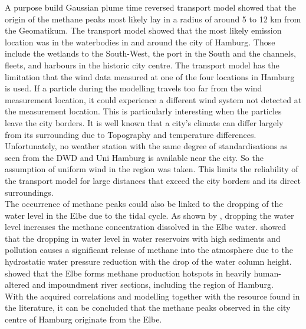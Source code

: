 A purpose build Gaussian plume time reversed transport model showed that the origin of the methane peaks most likely lay in a radius of around 5 to 12 km from the Geomatikum. The transport model showed that the most likely emission location was in the waterbodies in and around the city of Hamburg. Those include the wetlands to the South-West, the port in the South and the channels, fleets, and harbours in the historic city centre. The transport model has the limitation that the wind data measured at one of the four locations in Hamburg is used. If a particle during the modelling travels too far from the wind measurement location, it could experience a different wind system not detected at the measurement location. This is particularly interesting when the particles leave the city borders. It is well known that a city’s climate can differ largely from its surrounding due to Topography and temperature differences. Unfortunately, no weather station with the same degree of standardisations as seen from the DWD and Uni Hamburg is available near the city. So the assumption of uniform wind in the region was taken. This limits the reliability of the transport model for large distances that exceed the city borders and its direct surroundings.\\
The occurrence of methane peaks could also be linked to the dropping of the water level in the Elbe due to the tidal cycle. As shown by \cite{Harrison.2017}, dropping the water level increases the methane concentration dissolved in the Elbe water. \cite{Matousu.2017} showed that the dropping in water level in water reservoirs with high sediments and pollution causes a significant release of methane into the atmosphere due to the hydrostatic water pressure reduction with the drop of the water column height. \cite{Matousu.2019}  showed that the Elbe forms methane production hotspots in heavily human-altered and impoundment river sections, including the region of Hamburg.\\
With the acquired correlations and modelling together with the resource found in the literature, it can be concluded that the methane peaks observed in the city centre of Hamburg originate from the Elbe.\\
